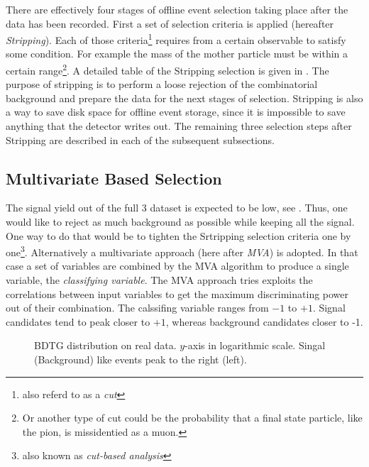 
There are effectively four stages of offline event selection taking place after the data has been recorded. 
First a set of selection criteria is applied (hereafter {\it Stripping}). Each of those criteria\footnote{also referd to as a {\it cut}}
requires from a certain observable to satisfy some condition. For example the mass of the mother particle \Bs must be within
a certain range\footnote{Or another type of cut could be the probability that a final state particle, like the pion, is missidentied
as a muon.}.  A detailed table of the Stripping selection is given in . The purpose of stripping is to perform
a loose rejection of the combinatorial background and prepare the data for the next stages of selection. Stripping is also a way to save
disk space for offline event storage, since it is impossible to save anything that the detector writes out. The remaining three selection
steps after Stripping are described in each of the subsequent subsections.

\subsection{Multivariate Based Selection}
\label{Multivariate_Based_Selection}

The \BsJpsiKst signal yield out of the full 3 \invfb dataset is expected to be low, see . Thus, one would like to
reject as much background as possible while keeping all the signal. One way to do that would be to tighten the Srtripping selection criteria
one by one\footnote{also known as {\it cut-based analysis}}. Alternatively a multivariate approach (here after {\it MVA}) is adopted. 
In that case a set of variables are combined by the MVA algorithm to produce a single variable, the {\it classifying variable}. 
The MVA approach tries exploits the correlations between input variables to get the maximum discriminating power out of their combination.
The calssifing variable ranges from $-1$ to $+1$. Signal candidates tend to peak closer to $+1$, whereas background candidates closer to -1. 

\begin{figure}[h]
\begin{center}
  \scalebox{1}{}
  \caption{BDTG distribution on real data. $y$-axis in logarithmic scale. Singal (Background) like events peak to the right (left). }
  \label{BTDG_performance}
\end{center}
\end{figure}

